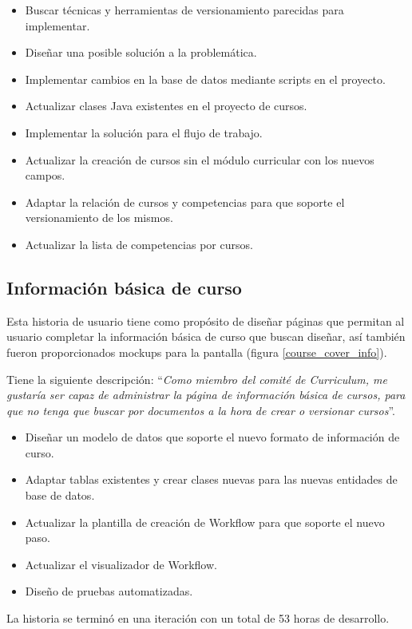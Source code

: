 \begin{itemize}
	\item Buscar técnicas y herramientas de versionamiento parecidas para implementar.
	\item Diseñar una posible solución a la problemática.
	\item Implementar cambios en la base de datos mediante scripts en el proyecto.
	\item Actualizar clases Java existentes en el proyecto de cursos.
	\item Implementar la solución para el flujo de trabajo.
	\item Actualizar la creación de cursos sin el módulo curricular con los nuevos campos.
	\item Adaptar la relación de cursos y competencias para que soporte el versionamiento de los mismos.
	\item Actualizar la lista de competencias por cursos.
\end{itemize}

\subsection{Información básica de curso}
Esta historia de usuario tiene como propósito de diseñar páginas que permitan al usuario completar la información básica de curso que buscan diseñar, así también fueron proporcionados mockups para la pantalla (figura \ref{course_cover_info}).

Tiene la siguiente descripción: \enquote{\textit{Como miembro del comité de Curriculum, me gustaría ser capaz de administrar la página de información básica de cursos, para que no tenga que buscar por documentos a la hora de crear o versionar cursos}}.

\begin{itemize}
	\item Diseñar un modelo de datos que soporte el nuevo formato de información de curso.
	\item Adaptar tablas existentes y crear clases nuevas para las nuevas entidades de base de datos.
	\item Actualizar la plantilla de creación de Workflow para que soporte el nuevo paso.
	\item Actualizar el visualizador de Workflow.
	\item Diseño de pruebas automatizadas.
\end{itemize}

La historia se terminó en una iteración con un total de 53 horas de desarrollo.

